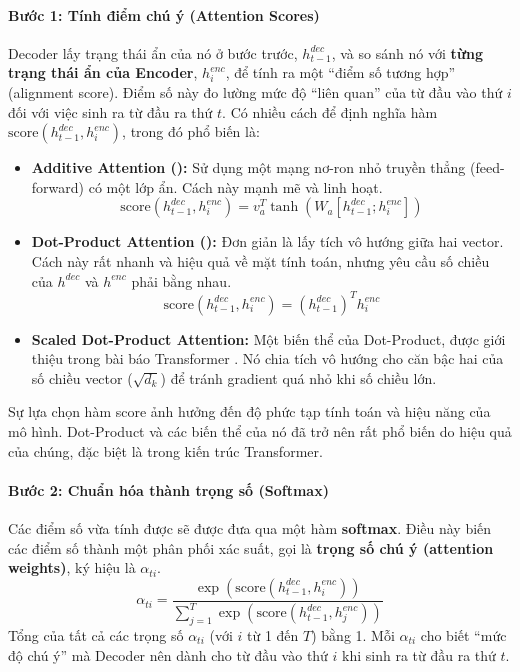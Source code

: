 \paragraph{Bước 1: Tính điểm chú ý (Attention Scores)}
Decoder lấy trạng thái ẩn của nó ở bước trước, $h_{t-1}^{dec}$, và so sánh nó với \textbf{từng trạng thái ẩn của Encoder}, $h_i^{enc}$, để tính ra một “điểm số tương hợp” (alignment score). Điểm số này đo lường mức độ “liên quan” của từ đầu vào thứ $i$ đối với việc sinh ra từ đầu ra thứ $t$. Có nhiều cách để định nghĩa hàm $\text{score}(h_{t-1}^{dec}, h_i^{enc})$, trong đó phổ biến là:
\begin{itemize}
    \item \textbf{Additive Attention (\cite{bahdanau2014neural}):} Sử dụng một mạng nơ-ron nhỏ truyền thẳng (feed-forward) có một lớp ẩn. Cách này mạnh mẽ và linh hoạt.
        $$ \text{score}(h_{t-1}^{dec}, h_i^{enc}) = v_a^T \tanh(W_a [h_{t-1}^{dec}; h_i^{enc}]) $$
    \item \textbf{Dot-Product Attention (\cite{luong2015effective}):} Đơn giản là lấy tích vô hướng giữa hai vector. Cách này rất nhanh và hiệu quả về mặt tính toán, nhưng yêu cầu số chiều của $h^{dec}$ và $h^{enc}$ phải bằng nhau.
        $$ \text{score}(h_{t-1}^{dec}, h_i^{enc}) = (h_{t-1}^{dec})^T h_i^{enc} $$
    \item \textbf{Scaled Dot-Product Attention:} Một biến thể của Dot-Product, được giới thiệu trong bài báo Transformer \cite{vaswani2017attention}. Nó chia tích vô hướng cho căn bậc hai của số chiều vector ($\sqrt{d_k}$) để tránh gradient quá nhỏ khi số chiều lớn.
\end{itemize}
Sự lựa chọn hàm score ảnh hưởng đến độ phức tạp tính toán và hiệu năng của mô hình. Dot-Product và các biến thể của nó đã trở nên rất phổ biến do hiệu quả của chúng, đặc biệt là trong kiến trúc Transformer.
\paragraph{Bước 2: Chuẩn hóa thành trọng số (Softmax)}
Các điểm số vừa tính được sẽ được đưa qua một hàm \textbf{softmax}. Điều này biến các điểm số thành một phân phối xác suất, gọi là \textbf{trọng số chú ý (attention weights)}, ký hiệu là $\alpha_{ti}$.
$$ \alpha_{ti} = \frac{\exp(\text{score}(h_{t-1}^{dec}, h_i^{enc}))}{\sum_{j=1}^{T} \exp(\text{score}(h_{t-1}^{dec}, h_j^{enc}))} $$
Tổng của tất cả các trọng số $\alpha_{ti}$ (với $i$ từ 1 đến $T$) bằng 1. Mỗi $\alpha_{ti}$ cho biết “mức độ chú ý” mà Decoder nên dành cho từ đầu vào thứ $i$ khi sinh ra từ đầu ra thứ $t$.

